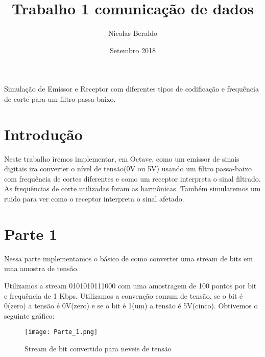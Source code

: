 \documentclass{article}
\title{Trabalho 1 comunicação de dados}
\author{Nicolas Beraldo}
\date{Setembro 2018}
\begin{document}
    \maketitle
        \begin{center}
            Simulação de Emissor e Receptor com diferentes tipos de codificação e frequência de corte para um filtro passa-baixo.
        \end{center}
    \section*{Introdução}
       Neste trabalho iremos implementar, em Octave, como um emissor de sinais digitais ira converter o nível de tensão(0V ou 5V) usando um filtro passa-baixo com frequência de cortes diferentes e como um receptor interpreta o sinal filtrado. As frequências de corte utilizadas foram as harmônicas. Também simularemos um ruido para ver como o receptor interpreta o sinal afetado.

    \section{Parte 1}
        Nessa parte implementamos o básico de como converter uma stream de bits em uma amostra de tensão. 
    
        Utilizamos a stream 0101010111000 com uma amostragem de 100 pontos por bit e frequência de 1 Kbps. Utilizamos a convenção comum de tensão, se o bit é 0(zero) a tensão é 0V(zero) e se o bit é 1(um) a tensão é 5V(cinco). Obtivemos o seguinte gráfico:
        \begin{figure}[H]
            \begin{center}
                \texttt{[image: Parte\_1.png]}
                \caption{Stream de bit convertido para neveis de tensão}
                \label{fig:Stream de bits convertido}
            \end{center}
        \end{figure}
        
\end{document}
